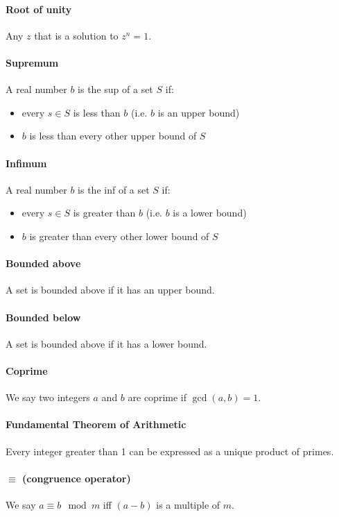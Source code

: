 \documentclass{scrartcl}
\begin{document}
\paragraph{Root of unity}
Any $ z $ that is a solution to $ z^{n} = 1 $.
\paragraph{Supremum}
A real number $ b $ is the sup of a set $ S $ if:
\begin{itemize}
\item every $ s \in S $ is less than $ b $ (i.e. $ b $ is an upper bound)
\item $ b $ is less than every other upper bound of $ S $
\end{itemize}
\paragraph{Infimum}
A real number $ b $ is the inf of a set $ S $ if:
\begin{itemize}
\item every $ s \in S $ is greater than $ b $ (i.e. $ b $ is a lower bound)
\item $ b $ is greater than every other lower bound of $ S $
\end{itemize}
\paragraph{Bounded above}
A set is bounded above if it has an upper bound.
\paragraph{Bounded below}
A set is bounded above if it has a lower bound.
\paragraph{Coprime}
We say two integers $ a $ and $ b $ are coprime if $ \gcd(a, b) = 1 $.
\paragraph{Fundamental Theorem of Arithmetic}
Every integer greater than 1 can be expressed as a unique product of primes.
\paragraph{$ \equiv$ (congruence operator)}
We say $ a \equiv b \mod m $ iff $ (a - b) $ is a multiple of $ m $.
\end{document}
